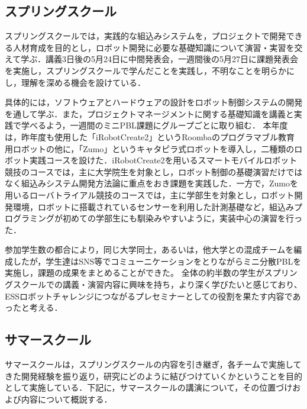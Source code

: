 \documentclass[submit]{ipsj}
\begin{document}
\subsection{スプリングスクール}

スプリングスクールでは，実践的な組込みシステムを，プロジェクトで開発できる人材育成を目的とし，ロボット開発に必要な基礎知識について演習・実習を交えて学ぶ．講義3日後の5月24日に中間発表会，一週間後の5月27日に課題発表会を実施し，スプリングスクールで学んだことを実践し，不明なことを明らかにし，理解を深める機会を設けている．

具体的には，ソフトウェアとハードウェアの設計をロボット制御システムの開発を通して学ぶ．また，プロジェクトマネージメントに関する基礎知識を講義と実践で学べるよう，一週間のミニPBL課題にグループごとに取り組む．
本年度は，昨年度も使用した「iRobotCreate2」というRoombaのプログラマブル教育用ロボットの他に，「Zumo」というキャタピラ式ロボットを導入し，二種類のロボット実践コースを設けた．iRobotCreate2を用いるスマートモバイルロボット競技のコースでは，主に大学院生を対象とし，ロボット制御の基礎演習だけではなく組込みシステム開発方法論に重点をおき課題を実践した．一方で，Zumoを用いるローバトライアル競技のコースでは，主に学部生を対象とし，ロボット開発環境，ロボットに搭載されているセンサーを利用した計測基礎など，組込みプログラミングが初めての学部生にも馴染みやすいように，実装中心の演習を行った．

参加学生数の都合により，同じ大学同士，あるいは，他大学との混成チームを編成したが，学生達はSNS等でコミューニケーションをとりながらミニ分散PBLを実施し，課題の成果をまとめることができた。
全体の約半数の学生がスプリングスクールでの講義・演習内容に興味を持ち，より深く学びたいと感じており、ESSロボットチャレンジにつながるプレセミナーとしての役割を果たす内容であったと考える．

\subsection{サマースクール}

サマースクールは，スプリングスクールの内容を引き継ぎ，各チームで実施してきた開発経験を振り返り，研究にどのように結びつけていくかということを目的として実施している．下記に，サマースクールの講演について，その位置づけおよび内容について概説する．
\end{document}
